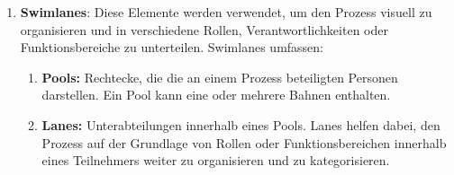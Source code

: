\begin{enumerate}[label=\arabic*., leftmargin=*]
    \item \textbf{Swimlanes}: Diese Elemente werden verwendet, um den Prozess visuell zu organisieren und in verschiedene Rollen, Verantwortlichkeiten oder Funktionsbereiche zu unterteilen. Swimlanes umfassen:
    \begin{enumerate}
        \item[] \begin{minipage}{\linewidth}
            \textbf{Pools:} Rechtecke, die die an einem Prozess beteiligten Personen darstellen. Ein Pool kann eine oder mehrere Bahnen enthalten.
            \begin{center}
            \end{center}
        \end{minipage}
        
        \item[] \begin{minipage}{\linewidth}
            \textbf{Lanes:} Unterabteilungen innerhalb eines Pools. Lanes helfen dabei, den Prozess auf der Grundlage von Rollen oder Funktionsbereichen innerhalb eines Teilnehmers weiter zu organisieren und zu kategorisieren.
            \begin{center}
            \end{center}
        \end{minipage}
    \end{enumerate}


\end{enumerate}
